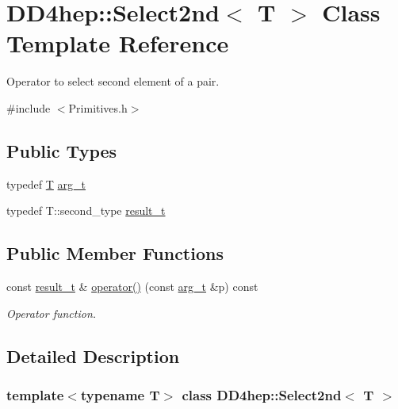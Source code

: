 \hypertarget{class_d_d4hep_1_1_select2nd}{}\section{D\+D4hep\+:\+:Select2nd$<$ T $>$ Class Template Reference}
\label{class_d_d4hep_1_1_select2nd}


Operator to select second element of a pair.  




{\ttfamily \#include $<$Primitives.\+h$>$}

\subsection*{Public Types}
\begin{DoxyCompactItemize}
\item 
typedef \hyperlink{class_t}{T} \hyperlink{class_d_d4hep_1_1_select2nd_a1159f763d3e02055e64e1c757c0e05c0}{arg\+\_\+t}
\item 
typedef T\+::second\+\_\+type \hyperlink{class_d_d4hep_1_1_select2nd_acfbf4d9607a113083ddcfa3b16385c2e}{result\+\_\+t}
\end{DoxyCompactItemize}
\subsection*{Public Member Functions}
\begin{DoxyCompactItemize}
\item 
const \hyperlink{class_d_d4hep_1_1_select2nd_acfbf4d9607a113083ddcfa3b16385c2e}{result\+\_\+t} \& \hyperlink{class_d_d4hep_1_1_select2nd_a2585cf82cc14235f21e8c493bb89185a}{operator()} (const \hyperlink{class_d_d4hep_1_1_select2nd_a1159f763d3e02055e64e1c757c0e05c0}{arg\+\_\+t} \&p) const
\begin{DoxyCompactList}\small\item\em Operator function. \end{DoxyCompactList}\end{DoxyCompactItemize}


\subsection{Detailed Description}
\subsubsection*{template$<$typename T$>$\newline
class D\+D4hep\+::\+Select2nd$<$ T $>$}

